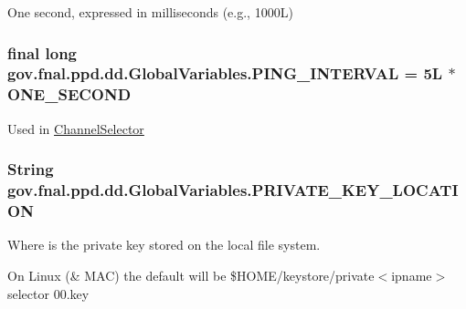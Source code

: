 One second, expressed in milliseconds (e.\-g., 1000\-L) \hypertarget{classgov_1_1fnal_1_1ppd_1_1dd_1_1GlobalVariables_ac2e535e1d551e5eae9749ad1ff4eeccf}{
\subsubsection[{P\-I\-N\-G\-\_\-\-I\-N\-T\-E\-R\-V\-A\-L}]{\setlength{\rightskip}{0pt plus 5cm}final long gov.\-fnal.\-ppd.\-dd.\-Global\-Variables.\-P\-I\-N\-G\-\_\-\-I\-N\-T\-E\-R\-V\-A\-L = 5\-L $\ast$ O\-N\-E\-\_\-\-S\-E\-C\-O\-N\-D\hspace{0.3cm}{\ttfamily [static]}}}\label{classgov_1_1fnal_1_1ppd_1_1dd_1_1GlobalVariables_ac2e535e1d551e5eae9749ad1ff4eeccf}
Used in \hyperlink{classgov_1_1fnal_1_1ppd_1_1dd_1_1ChannelSelector}{Channel\-Selector} \hypertarget{classgov_1_1fnal_1_1ppd_1_1dd_1_1GlobalVariables_aa26c21d05850efb85c8f5517d8258e5d}{
\subsubsection[{P\-R\-I\-V\-A\-T\-E\-\_\-\-K\-E\-Y\-\_\-\-L\-O\-C\-A\-T\-I\-O\-N}]{\setlength{\rightskip}{0pt plus 5cm}String gov.\-fnal.\-ppd.\-dd.\-Global\-Variables.\-P\-R\-I\-V\-A\-T\-E\-\_\-\-K\-E\-Y\-\_\-\-L\-O\-C\-A\-T\-I\-O\-N\hspace{0.3cm}{\ttfamily [static]}}}\label{classgov_1_1fnal_1_1ppd_1_1dd_1_1GlobalVariables_aa26c21d05850efb85c8f5517d8258e5d}
Where is the private key stored on the local file system.

On Linux (\& M\-A\-C) the default will be \$\-H\-O\-M\-E/keystore/private$<$ipname$>$ selector 00.\-key

